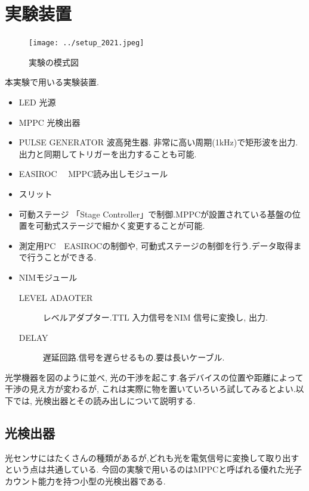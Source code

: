 
\section{実験装置}
\begin{figure}[h]
  \begin{center}
    \texttt{[image: ../setup\_2021.jpeg]}
  \end{center}
  \caption{実験の模式図}
\end{figure}

本実験で用いる実験装置.
\begin{itemize}
	\item LED 光源
	\item MPPC 光検出器
	\item PULSE GENERATOR 波高発生器. 非常に高い周期(1kHz)で矩形波を出力.出力と同期してトリガーを出力することも可能.
	\item EASIROC　 MPPC読み出しモジュール
	\item スリット　 
	\item 可動ステージ 「Stage Controller」で制御.MPPCが設置されている基盤の位置を可動式ステージで細かく変更することが可能.
	 \item 測定用PC　EASIROCの制御や, 可動式ステージの制御を行う.データ取得まで行うことができる.
	 \item NIMモジュール
\begin{description}
  		\item[LEVEL ADAOTER] レベルアダプター.TTL 入力信号をNIM 信号に変換し, 出力.
  		\item[DELAY] 遅延回路.信号を遅らせるもの.要は長いケーブル.
\end{description}
\end{itemize}
光学機器を図のように並べ, 光の干渉を起こす.各デバイスの位置や距離によって干渉の見え方が変わるが, これは実際に物を置いていろいろ試してみるとよい.以下では, 光検出器とその読み出しについて説明する.

\subsection{光検出器}
光センサにはたくさんの種類があるが,どれも光を電気信号に変換して取り出すという点は共通している.
今回の実験で用いるのはMPPCと呼ばれる優れた光子カウント能力を持つ小型の光検出器である.


